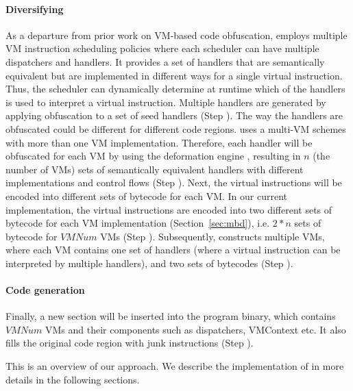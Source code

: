 \paragraph*{Diversifying}
As a departure from prior work on VM-based code obfuscation, \DSVMP employs multiple VM instruction scheduling policies
where each scheduler can have multiple dispatchers and handlers. It provides a set of handlers 
that are semantically equivalent but  are implemented in different ways for a single virtual instruction. 
Thus, the scheduler can dynamically determine at runtime which of the handlers is used to interpret a virtual instruction. 
Multiple handlers are generated by applying obfuscation to a set of seed handlers (Step ).
The way the handlers are obfuscated could be different for different code regions.
\DSVMP uses a multi-VM schemes with more than one VM implementation. 
Therefore, each handler will be obfuscated for each VM by using the deformation engine , resulting in $n$ (the number of VMs) sets of semantically equivalent handlers with different implementations and control flows (Step ). 
Next, the virtual instructions will be encoded into different sets of bytecode for each VM. In our current implementation, the virtual instructions
are encoded into two different sets of bytecode for each VM implementation (Section~\ref {sec:mbd}), i.e. $2*n$ sets of bytecode for $VMNum$ VMs (Step ). Subsequently, \DSVMP constructs multiple VMs, where each VM contains one set of handlers (where a virtual instruction
can be interpreted by multiple handlers), and two sets of bytecodes (Step ).

\paragraph*{Code generation}
Finally, a new section will be inserted into the program binary, which contains $VMNum$ VMs and their components such as dispatchers, VMContext etc. It also fills the original code region with junk instructions (Step ).

This is an overview of our approach. We describe the implementation of \DSVMP in more details in the following sections.
